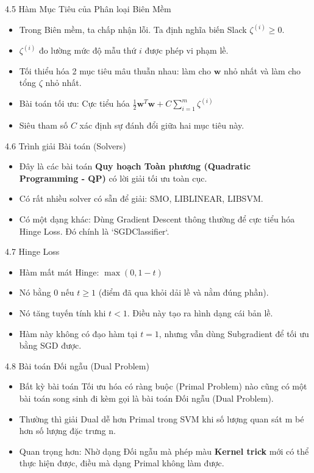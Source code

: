 \documentclass[aspectratio=169, 12pt]{beamer}
\begin{document}
\begin{frame}{4.5 Hàm Mục Tiêu của Phân loại Biên Mềm}
    \begin{itemize}
        \item Trong Biên mềm, ta chấp nhận lỗi. Ta định nghĩa biến Slack $\zeta^{(i)} \ge 0$.
        \item $\zeta^{(i)}$ đo lường mức độ mẫu thứ $i$ được phép vi phạm lề.
        \item Tối thiểu hóa 2 mục tiêu mâu thuẫn nhau: làm cho $\mathbf{w}$ nhỏ nhất và làm cho tổng $\zeta$ nhỏ nhất.
        \item Bài toán tối ưu: Cực tiểu hóa $\frac{1}{2} \mathbf{w}^T \mathbf{w} + C \sum_{i=1}^m \zeta^{(i)}$
        \item Siêu tham số $C$ xác định sự đánh đổi giữa hai mục tiêu này.
    \end{itemize}
\end{frame}

\begin{frame}{4.6 Trình giải Bài toán (Solvers)}
    \begin{itemize}
        \item Đây là các bài toán \textbf{Quy hoạch Toàn phương (Quadratic Programming - QP)} có lời giải tối ưu toàn cục.
        \item Có rất nhiều solver có sẵn để giải: SMO, LIBLINEAR, LIBSVM.
        \item Có một dạng khác: Dùng Gradient Descent thông thường để cực tiểu hóa Hinge Loss. Đó chính là `SGDClassifier`.
    \end{itemize}
\end{frame}

\begin{frame}{4.7 Hinge Loss}
    \begin{itemize}
        \item Hàm mất mát Hinge: $\max(0, 1 - t)$
        \item Nó bằng 0 nếu $t \ge 1$ (điểm đã qua khỏi dải lề và nằm đúng phần).
        \item Nó tăng tuyến tính khi $t < 1$. Điều này tạo ra hình dạng cái bản lề.
        \item Hàm này không có đạo hàm tại $t=1$, nhưng vẫn dùng Subgradient để tối ưu bằng SGD được.
    \end{itemize}
\end{frame}

\begin{frame}{4.8 Bài toán Đối ngẫu (Dual Problem)}
    \begin{itemize}
        \item Bất kỳ bài toán Tối ưu hóa có ràng buộc (Primal Problem) nào cũng có một bài toán song sinh đi kèm gọi là bài toán Đối ngẫu (Dual Problem).
        \item Thường thì giải Dual dễ hơn Primal trong SVM khi số lượng quan sát m bé hơn số lượng đặc trưng n.
        \item Quan trọng hơn: Nhờ dạng Đối ngẫu mà phép màu \textbf{Kernel trick} mới có thể thực hiện được, điều mà dạng Primal không làm được.
    \end{itemize}
\end{frame}
\end{document}
